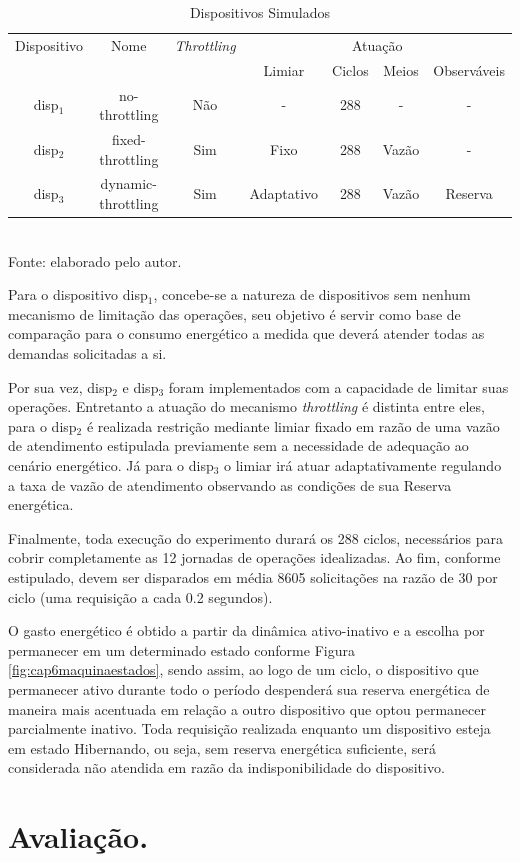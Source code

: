 \begin{table}[h]
	
	\centering
	\caption{Dispositivos Simulados}
	\small
	\begin{tabular}{ c c c c c c c}
		\toprule
		Dispositivo & Nome & \textit{Throttling} & \multicolumn{4}{c}{Atuação}\\\cline{4-7}		
		& & & Limiar & Ciclos & Meios & Observáveis\\
		\hline
		disp$_1$ & no-throttling  & Não & - & 288 & - & - \\
		disp$_2$ & fixed-throttling  & Sim & Fixo & 288 & Vazão & - \\
		disp$_3$ & dynamic-throttling  & Sim & Adaptativo & 288 & Vazão & Reserva \\
		\bottomrule
	\end{tabular}
	\label{table:cap6:dispositivosutilizados}
	\\
	\footnotesize Fonte: elaborado pelo autor.
	
\end{table}
\endgroup

Para o dispositivo disp$_1$, concebe-se a natureza de dispositivos sem nenhum mecanismo de limitação das operações, seu objetivo é servir como base de comparação para o consumo energético a medida que deverá atender todas as demandas solicitadas a si.

Por sua vez, disp$_2$  e disp$_3$ foram implementados com a capacidade de limitar suas operações. Entretanto a atuação do mecanismo \textit{throttling} é distinta entre eles, para o disp$_2$ é realizada restrição mediante limiar fixado em razão de uma vazão de atendimento estipulada previamente sem a necessidade de adequação ao cenário energético. Já para o disp$_3$ o limiar irá atuar adaptativamente regulando a taxa de vazão de atendimento observando as condições de sua Reserva energética.

Finalmente, toda execução do experimento durará os 288 ciclos, necessários para cobrir completamente as 12 jornadas de operações idealizadas. Ao fim, conforme estipulado, devem ser disparados em média 8605 solicitações na razão de 30 por ciclo (uma requisição a cada 0.2 segundos). 

O gasto energético é obtido a partir da dinâmica ativo-inativo e a escolha por permanecer em um determinado estado conforme Figura \ref{fig:cap6maquinaestados}, sendo assim, ao logo de um ciclo, o dispositivo que permanecer ativo durante todo o período despenderá sua reserva energética de maneira mais acentuada em relação a outro dispositivo que optou permanecer parcialmente inativo. Toda requisição realizada enquanto um dispositivo esteja em estado Hibernando, ou seja, sem reserva energética suficiente, será considerada não atendida em razão da indisponibilidade do dispositivo.


\section{Avaliação.}
\label{cap6:avaliacao}
 